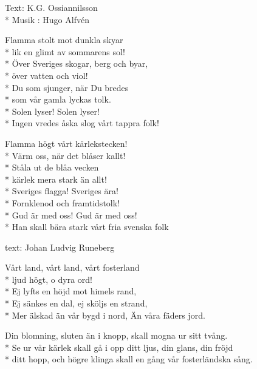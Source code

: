 \begin{SongText}
    \begin{SongInfo}
        Text: K.G. Ossiannilsson\\*%
        Musik : Hugo Alfvén
    \end{SongInfo}
    \begin{Verse}
        Flamma stolt mot dunkla skyar\\*%
        lik en glimt av sommarens sol!\\*%
        Över Sveriges skogar, berg och byar,\\*%
        över vatten och viol!\\*%
        Du som sjunger, när Du bredes\\*%
        som vår gamla lyckas tolk.\\*%
        Solen lyser! Solen lyser!\\*%
        Ingen vredes åska slog vårt tappra folk!
    \end{Verse}
    \begin{Verse}
        Flamma högt vårt kärlekstecken!\\*%
        Värm oss, när det blåser kallt!\\*%
        Ståla ut de blåa vecken\\*%
        kärlek mera stark än allt!\\*%
        Sveriges flagga! Sveriges ära!\\*%
        Fornklenod och framtidstolk!\\*%
        Gud är med oss! Gud är med oss!\\*%
        Han skall bära stark vårt fria svenska folk
    \end{Verse}
\end{SongText}

\begin{SongText}
    \begin{SongInfo}
        text: Johan Ludvig Runeberg
    \end{SongInfo}
    \begin{Verse}
        Vårt land, vårt land, vårt fosterland\\*%
        ljud högt, o dyra ord!\\*%
        Ej lyfts en höjd mot himels rand,\\*%
        Ej sänkes en dal, ej sköljs en strand,\\*%
        Mer älskad än vår bygd i nord, Än våra fäders jord.
    \end{Verse}
    \begin{Verse}
        Din blomning, sluten än i knopp, skall mogna ur sitt tvång.\\*%
        Se ur vår kärlek skall gå i opp ditt ljus, din glans, din fröjd\\*%
        ditt hopp, och högre klinga skall en gång vår fosterländska sång.
    \end{Verse}
\end{SongText}

